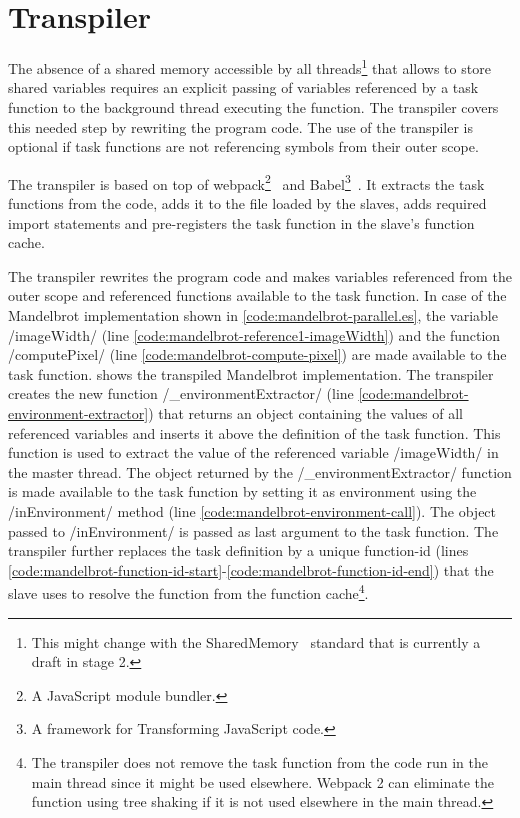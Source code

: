 \section{Transpiler}\label{sec:transpiler}
The absence of a shared memory accessible by all threads\footnote{This might change with the SharedMemory~\cite{Ecma2016} standard that is currently a draft in stage 2.} that allows to store shared variables requires an explicit passing of variables referenced by a task function to the background thread executing the function. The transpiler covers this needed step by rewriting the program code. The use of the transpiler is optional if task functions are not referencing symbols from their outer scope.


The transpiler is based on top of webpack\footnote{A JavaScript module bundler.}~\cite{webpack} and Babel\footnote{A framework for Transforming JavaScript code.}~\cite{babel}. It extracts the task functions from the code, adds it to the file loaded by the slaves, adds required import statements and pre-registers the task function in the slave's function cache. 

The transpiler rewrites the program code and makes variables referenced from the outer scope and referenced functions available to the task function. In case of the Mandelbrot implementation shown in \cref{code:mandelbrot-parallel.es}, the variable \javascriptinline/imageWidth/ (line \ref{code:mandelbrot-reference1-imageWidth}) and the function \javascriptinline/computePixel/ (line \ref{code:mandelbrot-compute-pixel}) are made available to the task function.  shows the transpiled Mandelbrot implementation. The transpiler creates the new function \javascriptinline/_environmentExtractor/ (line \ref{code:mandelbrot-environment-extractor}) that returns an object containing the values of all referenced variables and inserts it above the definition of the task function. This function is used to extract the value of the referenced variable \javascriptinline/imageWidth/ in the master thread. The object returned by the \javascriptinline/_environmentExtractor/ function is made available to the task function by setting it as environment using the \javascriptinline/inEnvironment/ method (line \ref{code:mandelbrot-environment-call}). The object passed to \javascriptinline/inEnvironment/ is passed as last argument to the task function. The transpiler further replaces the task definition by a unique function-id (lines \ref{code:mandelbrot-function-id-start}-\ref{code:mandelbrot-function-id-end}) that the slave uses to resolve the function from the function cache\footnote{The transpiler does not remove the task function from the code run in the main thread since it might be used elsewhere. Webpack 2 can eliminate the function using tree shaking if it is not used elsewhere in the main thread.}. 

